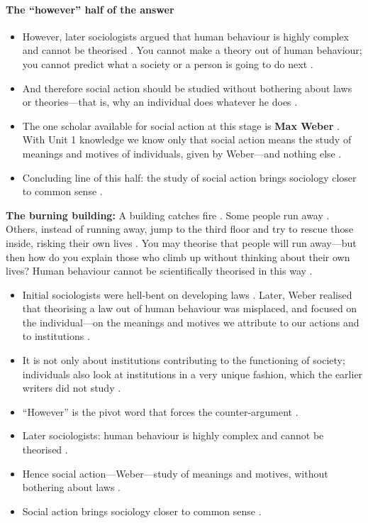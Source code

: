 \paragraph{The ``however'' half of the answer}
\begin{itemize}
    \item However, later sociologists argued that human behaviour is highly complex and cannot be theorised . You cannot make a theory out of human behaviour; you cannot predict what a society or a person is going to do next .
    \item And therefore social action should be studied without bothering about laws or theories---that is, why an individual does whatever he does .
    \item The one scholar available for social action at this stage is \textbf{Max Weber} . With Unit 1 knowledge we know only that social action means the study of meanings and motives of individuals, given by Weber---and nothing else .
    \item Concluding line of this half: the study of social action brings sociology closer to common sense .
\end{itemize}

\begin{ExampleBox}
\textbf{The burning building:} A building catches fire . Some people run away . Others, instead of running away, jump to the third floor and try to rescue those inside, risking their own lives . You may theorise that people will run away---but then how do you explain those who climb up without thinking about their own lives? Human behaviour cannot be scientifically theorised in this way .
\end{ExampleBox}

\begin{CriticalPoint}
\begin{itemize}
    \item Initial sociologists were hell-bent on developing laws . Later, Weber realised that theorising a law out of human behaviour was misplaced, and focused on the individual---on the meanings and motives we attribute to our actions and to institutions .
    \item It is not only about institutions contributing to the functioning of society; individuals also look at institutions in a very unique fashion, which the earlier writers did not study .
\end{itemize}
\end{CriticalPoint}

\begin{QuickRevision}
\begin{itemize}
    \item ``However'' is the pivot word that forces the counter-argument .
    \item Later sociologists: human behaviour is highly complex and cannot be theorised .
    \item Hence social action---Weber---study of meanings and motives, without bothering about laws .
    \item Social action brings sociology closer to common sense .
\end{itemize}
\end{QuickRevision}

